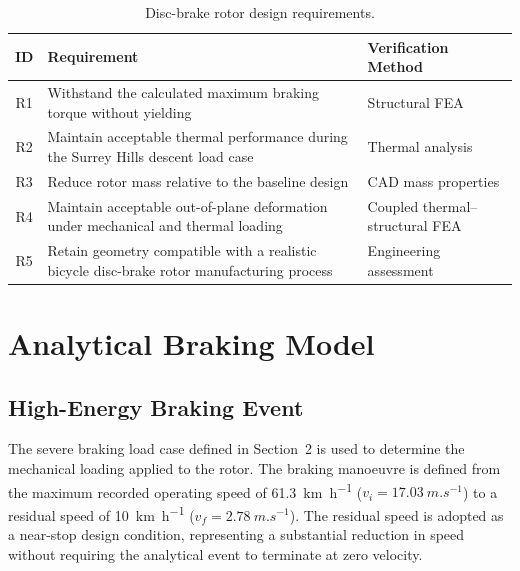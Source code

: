 \documentclass[11pt,a4paper]{article}
\begin{document}
\begin{table}[H]
    \centering
    \caption{Disc-brake rotor design requirements.}
    \label{tab:requirements}
    \begin{tabularx}{\textwidth}{c X X}
        \toprule
        ID & Requirement & Verification Method \\
        \midrule

        R1 &
        Withstand the calculated maximum braking torque without yielding &
        Structural FEA \\

        R2 &
        Maintain acceptable thermal performance during the Surrey Hills
        descent load case &
        Thermal analysis \\

        R3 &
        Reduce rotor mass relative to the baseline design &
        CAD mass properties \\

        R4 &
        Maintain acceptable out-of-plane deformation under mechanical and
        thermal loading &
        Coupled thermal--structural FEA \\

        R5 &
        Retain geometry compatible with a realistic bicycle disc-brake rotor
        manufacturing process &
        Engineering assessment \\

        \bottomrule
    \end{tabularx}
\end{table}

\section{Analytical Braking Model}
\subsection{High-Energy Braking Event}

The severe braking load case defined in Section~2 is used to determine the
mechanical loading applied to the rotor. The braking manoeuvre is defined from
the maximum recorded operating speed of
\SI{61.3}{km.h^{-1}} ($v_i=\SI{17.03}{m.s^{-1}}$) to a residual speed of
\SI{10}{km.h^{-1}} ($v_f=\SI{2.78}{m.s^{-1}}$). The residual speed is adopted
as a near-stop design condition, representing a substantial reduction in speed
without requiring the analytical event to terminate at zero velocity.
\end{document}
